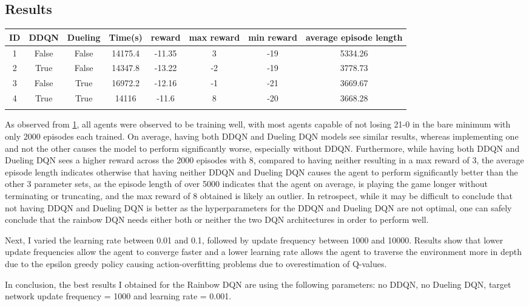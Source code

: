 \subsection{Results}
\begin{table}[h]
	\centering
	\scriptsize
	\begin{tabular}{c c c | c c c c c}
		\toprule
		ID & DDQN & Dueling & Time(s) & reward & max reward & min reward & average episode length \\
  \midrule
		\colorbox{id1}{1} & False & False & 14175.4 & -11.35 & 3 & -19 & 5334.26 \\
		\colorbox{id2}{2} & True & False & 14347.8 & -13.22 & -2 & -19 & 3778.73 \\
		\colorbox{id3}{3} & False & True & 16972.2 & -12.16 & -1 & -21 & 3669.67 \\
		\colorbox{id4}{4} & True & True & 14116 & -11.6 & 8 & -20 & 3668.28 \\
  \bottomrule
  \label{Gridsearch Results}
  \end{tabular}
  \end{table}

  As observed from \cref{Gridsearch Results}, all agents were observed to be training well, with most agents capable of not losing 21-0 in the bare minimum with only 2000 episodes each trained. On average, having both DDQN and Dueling DQN models see similar results, whereas implementing one and not the other causes the model to perform significantly worse, especially without DDQN.
  Furthermore, while having both DDQN and Dueling DQN sees a higher reward across the 2000 episodes with 8, compared to having neither resulting in a max reward of 3, the average episode length indicates otherwise that having neither DDQN and Dueling DQN causes the agent to perform significantly better than the other 3 parameter sets, as the episode length of over 5000 indicates that the agent on average, is playing the game longer without terminating or truncating, and the max reward of 8 obtained is likely an outlier.
  In retrospect, while it may be difficult to conclude that not having DDQN and Dueling DQN is better as the hyperparameters for the DDQN and Dueling DQN are not optimal, one can safely conclude that the rainbow DQN needs either both or neither the two DQN architectures in order to perform well.

  Next, I varied the learning rate between 0.01 and 0.1, followed by update frequency between 1000 and 10000. Results show that lower update frequencies allow the agent to converge faster and a lower learning rate allows the agent to traverse the environment more in depth due to the epsilon greedy policy causing action-overfitting problems due to overestimation of Q-values.

In conclusion, the best results I obtained for the Rainbow DQN are using the following parameters: no DDQN, no Dueling DQN, target network update frequency = 1000 and learning rate = 0.001.